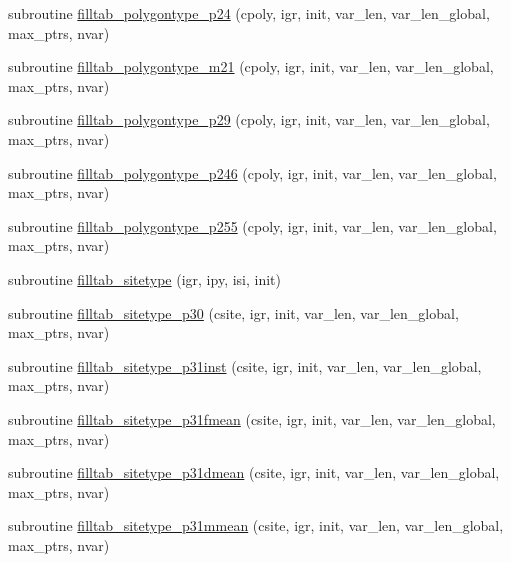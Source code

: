 \begin{DoxyCompactItemize}
\item 
subroutine \hyperlink{namespaceed__state__vars_afabb5f55cd27b2d47fc19be14314ee61}{filltab\+\_\+polygontype\+\_\+p24} (cpoly, igr, init, var\+\_\+len, var\+\_\+len\+\_\+global, max\+\_\+ptrs, nvar)
\item 
subroutine \hyperlink{namespaceed__state__vars_ada572b0a43655456a132bf574b33ed7f}{filltab\+\_\+polygontype\+\_\+m21} (cpoly, igr, init, var\+\_\+len, var\+\_\+len\+\_\+global, max\+\_\+ptrs, nvar)
\item 
subroutine \hyperlink{namespaceed__state__vars_a63083121712f3f902667c53218987e46}{filltab\+\_\+polygontype\+\_\+p29} (cpoly, igr, init, var\+\_\+len, var\+\_\+len\+\_\+global, max\+\_\+ptrs, nvar)
\item 
subroutine \hyperlink{namespaceed__state__vars_a767e7b3c2632bb5bae2c57b3d5671780}{filltab\+\_\+polygontype\+\_\+p246} (cpoly, igr, init, var\+\_\+len, var\+\_\+len\+\_\+global, max\+\_\+ptrs, nvar)
\item 
subroutine \hyperlink{namespaceed__state__vars_af1a7d7f50a0d28613072bb4a1832c3e3}{filltab\+\_\+polygontype\+\_\+p255} (cpoly, igr, init, var\+\_\+len, var\+\_\+len\+\_\+global, max\+\_\+ptrs, nvar)
\item 
subroutine \hyperlink{namespaceed__state__vars_adfda51c18d9eb4eab6a5f2d479eccd29}{filltab\+\_\+sitetype} (igr, ipy, isi, init)
\item 
subroutine \hyperlink{namespaceed__state__vars_a556ff3dcf4b87ae8fe4e3319e1196d27}{filltab\+\_\+sitetype\+\_\+p30} (csite, igr, init, var\+\_\+len, var\+\_\+len\+\_\+global, max\+\_\+ptrs, nvar)
\item 
subroutine \hyperlink{namespaceed__state__vars_a8bc8b68929a7a916f6b7935bb29a633a}{filltab\+\_\+sitetype\+\_\+p31inst} (csite, igr, init, var\+\_\+len, var\+\_\+len\+\_\+global, max\+\_\+ptrs, nvar)
\item 
subroutine \hyperlink{namespaceed__state__vars_a195c33fe08578b92692e488eb565861d}{filltab\+\_\+sitetype\+\_\+p31fmean} (csite, igr, init, var\+\_\+len, var\+\_\+len\+\_\+global, max\+\_\+ptrs, nvar)
\item 
subroutine \hyperlink{namespaceed__state__vars_ab7a9ec8185269ed2dda4bf9538a21416}{filltab\+\_\+sitetype\+\_\+p31dmean} (csite, igr, init, var\+\_\+len, var\+\_\+len\+\_\+global, max\+\_\+ptrs, nvar)
\item 
subroutine \hyperlink{namespaceed__state__vars_a89840a7049b8ec0e90010deda231bcdc}{filltab\+\_\+sitetype\+\_\+p31mmean} (csite, igr, init, var\+\_\+len, var\+\_\+len\+\_\+global, max\+\_\+ptrs, nvar)

\end{DoxyCompactItemize}
